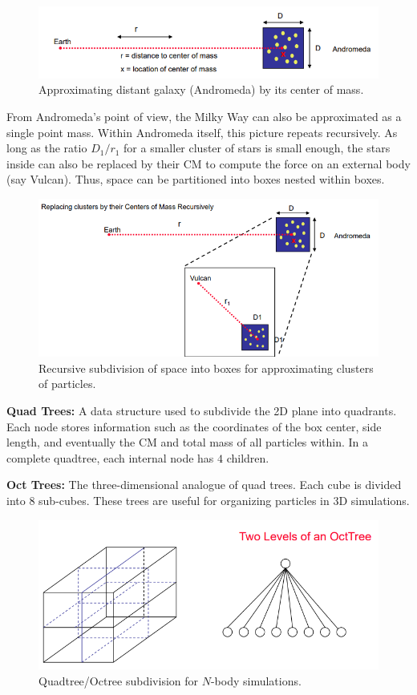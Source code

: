 \documentclass[12pt]{book}
\begin{document}
\begin{figure}[ht]
    \centering
    \includegraphics[width=0.5\linewidth]{images/nbodysim.png}
    \caption{Approximating distant galaxy (Andromeda) by its center of mass.}
\end{figure}

From Andromeda’s point of view, the Milky Way can also be approximated as a single point mass. Within Andromeda itself, this picture repeats recursively. As long as the ratio $D_1/r_1$ for a smaller cluster of stars is small enough, the stars inside can also be replaced by their CM to compute the force on an external body (say Vulcan). Thus, space can be partitioned into boxes nested within boxes.

\begin{figure}[ht]
    \centering
    \includegraphics[width=0.5\linewidth]{images/nbodysim1.png}
    \caption{Recursive subdivision of space into boxes for approximating clusters of particles.}
\end{figure}

\textbf{Quad Trees:} A data structure used to subdivide the 2D plane into quadrants. Each node stores information such as the coordinates of the box center, side length, and eventually the CM and total mass of all particles within. In a complete quadtree, each internal node has $4$ children.

\medskip

\textbf{Oct Trees:} The three-dimensional analogue of quad trees. Each cube is divided into $8$ sub-cubes. These trees are useful for organizing particles in 3D simulations.

\begin{figure}[ht]
    \centering
    \includegraphics[width=0.5\linewidth]{images/nbodysim2.png}
    \caption{Quadtree/Octree subdivision for $N$-body simulations.}
\end{figure}
\end{document}

